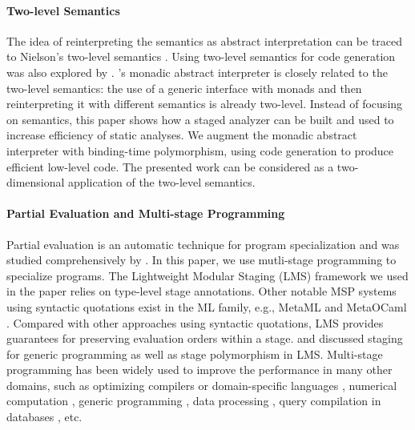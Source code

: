 \paragraph{Two-level Semantics} The idea of reinterpreting the semantics as
abstract interpretation can be traced to Nielson's two-level semantics
\cite{NIELSON1989117}. Using two-level semantics for code generation
was also explored by \citet{NIELSON198859}.
\citet{Sergey:2013:MAI:2491956.2491979}'s monadic abstract
interpreter is closely related to the two-level semantics: the
use of a generic interface with monads and then reinterpreting it with
different semantics is already two-level. Instead of focusing on
semantics, this paper shows how a staged analyzer can be built and
used to increase efficiency of static analyses. We augment the monadic
abstract interpreter with binding-time polymorphism, using code generation to
produce efficient low-level code. The presented work can be considered as
a two-dimensional application of the two-level semantics.

\paragraph{Partial Evaluation and Multi-stage Programming}
Partial evaluation is an automatic technique for program
specialization and was studied comprehensively by
\citet{10.1007/3-540-61580-6_11, DBLP:books/daglib/0072559}.
In this paper, we use mutli-stage programming to specialize programs.
The Lightweight Modular Staging (LMS) framework
\cite{DBLP:conf/gpce/RompfO10} we used in the paper relies on
type-level stage annotations.  Other notable MSP systems using syntactic
quotations exist in the ML family, e.g., MetaML \cite{DBLP:conf/pepm/TahaS97}
and MetaOCaml \cite{DBLP:conf/gpce/CalcagnoTHL03, DBLP:conf/flops/Kiselyov14}. 
Compared with other approaches using syntactic quotations, LMS provides
guarantees for preserving evaluation orders within a stage.
\citet{Ofenbeck:2017:SGP:3136040.3136060} and
\citet{Amin:2017:CTI:3177123.3158140} discussed staging for generic programming
as well as stage polymorphism in LMS.
Multi-stage programming has been widely used to improve the
performance in many other domains, such as optimizing compilers or
domain-specific languages \cite{DBLP:conf/pldi/RompfSBLCO14,
  DBLP:conf/snapl/RompfBLSJAOSKDK15,
  DBLP:journals/tecs/SujeethBLRCOO14, DBLP:conf/gpce/SujeethGBLROO13,
  DBLP:journals/jfp/CaretteKS09}, numerical computation \cite{PGL-038,
  DBLP:conf/pepm/AktemurKKS13}, generic programming
\cite{DBLP:journals/pacmpl/Yallop17,
  Ofenbeck:2017:SGP:3136040.3136060}, data processing
\cite{DBLP:conf/oopsla/JonnalageddaCSRO14,
  DBLP:conf/popl/KiselyovBPS17}, query compilation in databases
\cite{DBLP:conf/osdi/EssertelTDBOR18, DBLP:conf/sigmod/TahboubER18},
etc.

